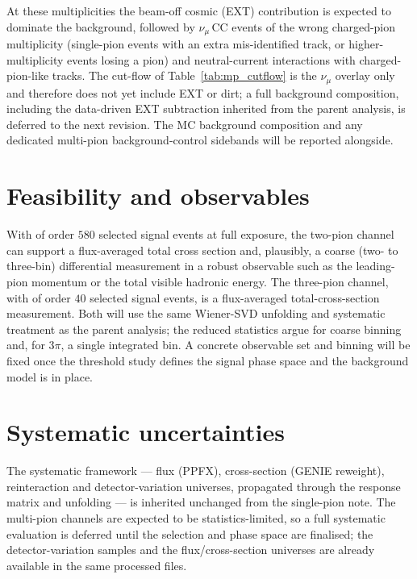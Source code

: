 \documentclass[11pt,a4paper]{article}
\begin{document}
At these multiplicities the beam-off cosmic (EXT) contribution is expected to dominate the
background, followed by $\nu_\mu\,\mathrm{CC}$ events of the wrong charged-pion
multiplicity (single-pion events with an extra mis-identified track, or higher-multiplicity
events losing a pion) and neutral-current interactions with charged-pion-like tracks. The
cut-flow of Table~\ref{tab:mp_cutflow} is the $\nu_\mu$ overlay only and therefore does not
yet include EXT or dirt; a full background composition, including the data-driven EXT
subtraction inherited from the parent analysis, is deferred to the next revision. The MC
background composition and any dedicated multi-pion background-control sidebands will be
reported alongside.

\section{Feasibility and observables}
\label{sec:feasibility}

With of order $580$ selected signal events at full exposure, the two-pion channel can
support a flux-averaged total cross section and, plausibly, a coarse (two- to three-bin)
differential measurement in a robust observable such as the leading-pion momentum or the
total visible hadronic energy. The three-pion channel, with of order $40$ selected signal
events, is a flux-averaged total-cross-section measurement. Both will use the same
Wiener-SVD unfolding and systematic treatment as the parent analysis; the reduced
statistics argue for coarse binning and, for $3\pi$, a single integrated bin. A concrete
observable set and binning will be fixed once the threshold study defines the signal phase
space and the background model is in place.

\section{Systematic uncertainties}
\label{sec:systematics}

The systematic framework --- flux (PPFX), cross-section (GENIE reweight), reinteraction
and detector-variation universes, propagated through the response matrix and unfolding ---
is inherited unchanged from the single-pion note. The multi-pion channels are expected to
be statistics-limited, so a full systematic evaluation is deferred until the selection and
phase space are finalised; the detector-variation samples and the flux/cross-section
universes are already available in the same processed files.
\end{document}
